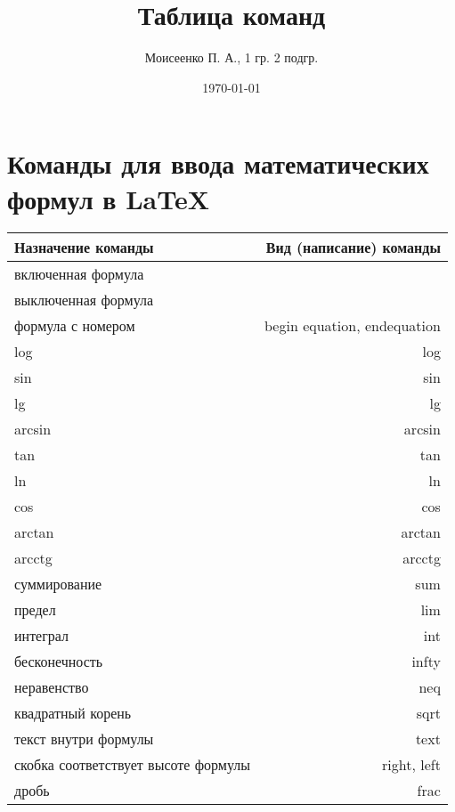 \documentclass[a4paper,12pt]{article} %
\author{Моисеенко П. А., 1 гр. 2 подгр.} %
\title{Таблица команд} %
\date{\today} %
\begin{document}
\maketitle
\newpage
\section*{Команды для ввода математических формул в \LaTeX}
\begin{tabular}{ l | r }
  \textbf{Назначение команды}		  & \textbf{Вид (написание) команды} \\ \hline
  включенная формула				  & $ $ \\ \hline
  выключенная формула				  & $$ $$ \\ \hline
  формула с номером					  & begin {equation}, end{equation} \\ \hline
  log								  & log \\ \hline
  sin								  & sin \\ \hline
  lg								  & lg \\ \hline
  arcsin							  & arcsin \\ \hline
  tan								  & tan \\ \hline
  ln								  & ln \\ \hline
  cos								  & cos \\ \hline
  arctan							  & arctan \\ \hline
  arcctg							  & arcctg \\ \hline
  суммирование						  & sum \\ \hline
  предел							  & lim \\ \hline
  интеграл							  & int \\ \hline
  бесконечность						  & infty \\ \hline
  неравенство						  & neq \\ \hline
  квадратный корень					  & sqrt \\ \hline
  текст внутри формулы 				  & text \\ \hline
  скобка соответствует высоте формулы & right, left \\ \hline
  дробь								  & frac
\end{tabular}
\end{document}
